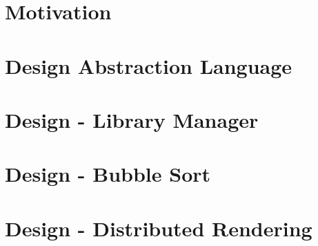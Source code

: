 \documentclass{article}
\begin{document}
\newpage
\section{Motivation}

 
\newpage
\section{Design Abstraction Language}

 
\newpage
\section{Design - Library Manager}

 
\newpage
\section{Design - Bubble Sort}

 
\newpage
\section{Design - Distributed Rendering}

\end{document}
